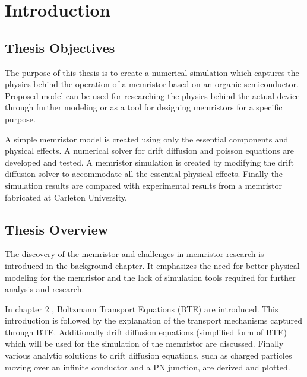 
\chapter{Introduction} %


\label{Chapter1} %


\section{Thesis Objectives}
\begin{doublespace}
The purpose of this thesis is to create a numerical simulation which captures the physics behind the operation of a memristor based on an organic semiconductor. Proposed model can be used for researching the physics behind the actual device through further modeling or as a tool for designing memristors for a specific purpose. 

A simple memristor model is created using only the essential components and physical effects. A numerical solver for drift diffusion and poisson equations are developed and tested. A memristor simulation is created by modifying the drift diffusion solver to accommodate all the essential physical effects. Finally the simulation results are compared with experimental results from a memristor fabricated at Carleton University.

\section{Thesis Overview}

The discovery of the memristor and challenges in memristor research is introduced in the background chapter. It emphasizes the need for better physical modeling for the memristor and the lack of simulation tools required for further analysis and research.

In chapter 2 , Boltzmann Transport Equations (BTE) are introduced. This introduction is followed by the explanation of the transport mechanisms captured through BTE. Additionally drift diffusion equations (simplified form of BTE) which will be used for the simulation of the memristor are discussed. Finally various analytic solutions to drift diffusion equations, such as charged particles moving over an infinite conductor and a PN junction, are derived and plotted. 


\end{doublespace}
